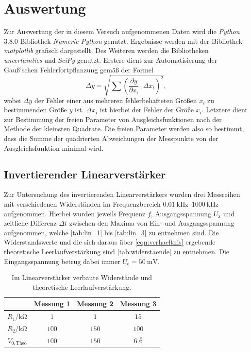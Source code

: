 \section{Auswertung}
Zur Auswertung der in diesem Versuch aufgenommenen Daten wird die \textit{Python} 3.8.0 Bibliothek
\textit{Numeric Python} \cite{numpy} genutzt. Ergebnisse werden mit der Bibliothek \textit{matplotlib} \cite{matplotlib} grafisch
dargestellt. Des Weiteren werden die Bibliotheken \textit{uncertainties} \cite{uncertainties} und \textit{SciPy} \cite{scipy} genutzt. Erstere dient zur Automatisierung der Gauß'schen Fehlerfortpflanzung gemäß der Formel
\begin{equation*}
  \Delta y = \sqrt{\sum \left(\frac{\partial y}{\partial x_i}\cdot \Delta x_i \right)^2},
\end{equation*}
wobei $\Delta y$ der Fehler einer aus mehreren fehlerbehafteten Größen $x_i$ zu bestimmenden Größe $y$ ist. $\Delta x_i$ ist hierbei der Fehler der Größe $x_i$. Letztere dient zur Bestimmung der freien Parameter von Ausgleichsfunktionen nach der Methode der kleinsten Quadrate. Die freien Parameter werden also so bestimmt, dass die Summe der quadrierten Abweichungen der Messpunkte von der Ausgleichsfunktion minimal wird.

\subsection{Invertierender Linearverstärker}
Zur Untersuchung des invertierenden Linearverstärkers wurden drei Messreihen mit verschiedenen Widerständen im Frequenzbereich $\SIrange{0.01}{1000}{\kilo\hertz}$ aufgenommen. Hierbei wurden jeweils Frequenz $f$, Ausgangsspannung $U_\mathrm{a}$ und zeitliche Differenz $\Delta t$ zwischen den Maxima von Ein- und Ausgangsspannung aufgenommen, welche \autoref{tab:lin_1} bis \ref{tab:lin_3} zu entnehmen sind. Die Widerstandswerte und die sich daraus über \autoref{eqn:verhaeltnis} ergebende theoretische Leerlaufverstärkung sind \autoref{tab:widerstaende} zu entnehmen. Die Eingangsspannung betrug dabei immer $U_\mathrm{e} = \SI{50}{\milli\volt}$.

\begin{table}[H]
  \centering
  \caption{Im Linearverstärker verbaute Widerstände und theoretische Leerlaufverstärkung.}
  \begin{tabular}{c c c c}
    \toprule
    & Messung 1 & Messung 2 & Messung 3\\
    \midrule
    $R_1$/$\si{\kilo\ohm}$ & $\num{1}$ & $\num{1}$ & $\num{15}$\\
    $R_2$/$\si{\kilo\ohm}$ & $\num{100}$ & $\num{150}$ & $\num{100}$\\
    $V_{0,\mathrm{Theo}}$ & $\num{100}$ & $\num{150}$ & $6.\bar{6}$\\
    \bottomrule
  \end{tabular}
  \label{tab:widerstaende}
\end{table}

